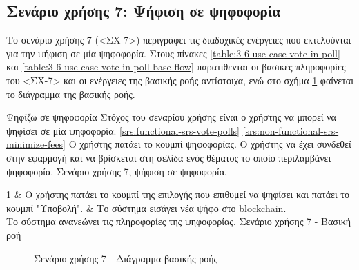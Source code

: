 \subsection{Σενάριο χρήσης 7: Ψήφιση σε ψηφοφορία} \label{subsection:3-6-use-case-vote-in-poll}

Το σενάριο χρήσης 7 (<ΣΧ-7>) περιγράφει τις διαδοχικές ενέργειες που εκτελούνται για την ψήφιση σε μία ψηφοφορία. Στους πίνακες \ref{table:3-6-use-case-vote-in-poll} και \ref{table:3-6-use-case-vote-in-poll-base-flow} παρατίθενται οι βασικές πληροφορίες του <ΣΧ-7> και οι ενέργειες της βασικής ροής αντίστοιχα, ενώ στο σχήμα \ref{figure:3-6-use-case-vote-in-poll-base-flow-sequence-diagram} φαίνεται το διάγραμμα της βασικής ροής.

\useCaseTable
{Ψηφίζω σε ψηφοφορία}
{Στόχος του σεναρίου χρήσης είναι ο χρήστης να μπορεί να ψηφίσει σε μία ψηφοφορία.}
{\ref{srs:functional-srs-vote-polls}}
{\ref{srs:non-functional-srs-minimize-fees}}
{Ο χρήστης πατάει το κουμπί ψηφοφορίας.}
{Ο χρήστης να έχει συνδεθεί στην εφαρμογή και να βρίσκεται στη σελίδα ενός θέματος το οποίο περιλαμβάνει ψηφοφορία.}
{Σενάριο χρήσης 7, ψήφιση σε ψηφοφορία.}
{\label{table:3-6-use-case-vote-in-poll}}


\useCaseBaseFlowTable
{
    1 & Ο χρήστης πατάει το κουμπί της επιλογής που επιθυμεί να ψηφίσει και πατάει το κουμπί "Υποβολή". & Το σύστημα εισάγει νέα ψήφο στο blockchain. \\ [0.5ex]
}
{Το σύστημα ανανεώνει τις πληροφορίες της ψηφοφορίας.}
{Σενάριο χρήσης 7 - Βασική ροή}
{\label{table:3-6-use-case-vote-in-poll-base-flow}}

\begin{figure}[H]
    \centering
    
    \caption{Σενάριο χρήσης 7 - Διάγραμμα βασικής ροής}
    \label{figure:3-6-use-case-vote-in-poll-base-flow-sequence-diagram}
\end{figure}
\vspace{2\baselineskip}